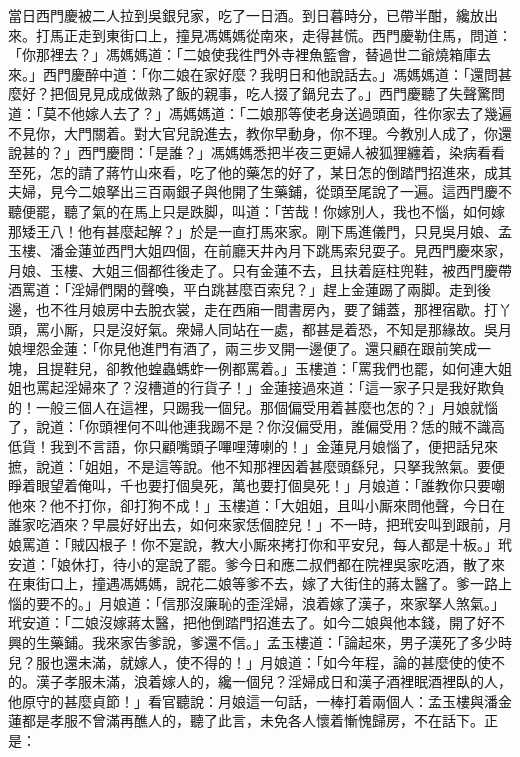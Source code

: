 當日西門慶被二人拉到吳銀兒家，吃了一日酒。到日暮時分，已帶半酣，纔放出來。打馬正走到東街口上，撞見馮媽媽從南來，走得甚慌。西門慶勒住馬，問道：「你那裡去？」馮媽媽道：「二娘使我徃門外寺裡魚籃會，替過世二爺燒箱庫去來。」西門慶醉中道：「你二娘在家好麼？我明日和他說話去。」{}馮媽媽道：「還問甚麼好？把個見見成成做熟了飯的親事，吃人掇了鍋兒去了。」西門慶聽了失聲驚問道：「莫不他嫁人去了？」馮媽媽道：「二娘那等使老身送過頭面，徃你家去了幾遍不見你，大門關着。對大官兒說進去，教你早動身，你不理。今教別人成了，你還說甚的？」西門慶問：「是誰？」馮媽媽悉把半夜三更婦人被狐狸纏着，染病看看至死，怎的請了蔣竹山來看，吃了他的藥怎的好了，某日怎的倒踏門招進來，成其夫婦，見今二娘拏出三百兩銀子與他開了生藥鋪，從頭至尾說了一遍。這西門慶不聽便罷，聽了氣的在馬上只是跌脚，叫道：「苦哉！你嫁別人，我也不惱，如何嫁那矮王八！他有甚麼起解？」於是一直打馬來家。剛下馬進儀門，只見吳月娘、孟玉樓、潘金蓮並西門大姐四個，在前廳天井內月下跳馬索兒耍子。見西門慶來家，月娘、玉樓、大姐三個都徃後走了。只有金蓮不去，且扶着庭柱兜鞋，{}被西門慶帶酒罵道：「淫婦們閑的聲喚，{}平白跳甚麼百索兒？」趕上金蓮踢了兩脚。走到後邊，也不徃月娘房中去脫衣裳，走在西廂一間書房內，要了鋪蓋，那裡宿歇。打丫頭，罵小厮，只是沒好氣。衆婦人同站在一處，都甚是着恐，不知是那緣故。吳月娘埋怨金蓮：「你見他進門有酒了，兩三步叉開一邊便了。還只顧在跟前笑成一塊，且提鞋兒，卻教他蝗蟲螞蚱一例都罵着。」玉樓道：「罵我們也罷，如何連大姐姐也罵起淫婦來了？沒槽道的行貨子！」金蓮接過來道：「這一家子只是我好欺負的！一般三個人在這裡，只踢我一個兒。那個偏受用着甚麼也怎的？」月娘就惱了，說道：「你頭裡何不叫他連我踢不是？你沒偏受用，誰偏受用？恁的賊不識高低貨！我到不言語，你只顧嘴頭子嗶哩薄喇的！」{}金蓮見月娘惱了，便把話兒來摭，說道：「姐姐，不是這等說。他不知那裡因着甚麼頭繇兒，只拏我煞氣。要便睜着眼望着俺叫，千也要打個臭死，萬也要打個臭死！」月娘道：「誰教你只要嘲他來？他不打你，卻打狗不成！」玉樓道：「大姐姐，且叫小厮來問他聲，今日在誰家吃酒來？早晨好好出去，如何來家恁個腔兒！」不一時，把玳安叫到跟前，月娘罵道：「賊囚根子！你不寔說，教大小厮來拷打你和平安兒，每人都是十板。」玳安道：「娘休打，待小的寔說了罷。爹今日和應二叔們都在院裡吳家吃酒，散了來在東街口上，撞遇馮媽媽，說花二娘等爹不去，嫁了大街住的蔣太醫了。爹一路上惱的要不的。」月娘道：「信那沒廉恥的歪淫婦，浪着嫁了漢子，來家拏人煞氣。」玳安道：「二娘沒嫁蔣太醫，把他倒踏門招進去了。如今二娘與他本錢，開了好不興的生藥鋪。我來家告爹說，爹還不信。」孟玉樓道：「論起來，男子漢死了多少時兒？服也還未滿，就嫁人，使不得的！」月娘道：「如今年程，論的甚麼使的使不的。漢子孝服未滿，浪着嫁人的，纔一個兒？淫婦成日和漢子酒裡眠酒裡臥的人，他原守的甚麼貞節！」看官聽說：月娘這一句話，一棒打着兩個人：孟玉樓與潘金蓮都是孝服不曾滿再醮人的，聽了此言，未免各人懷着慚愧歸房，不在話下。正是：

